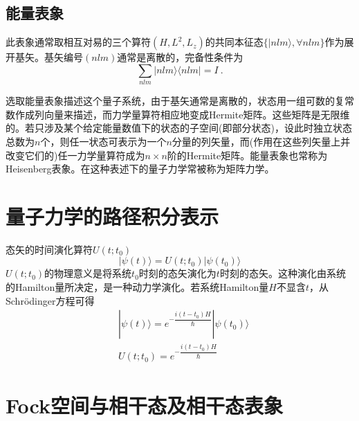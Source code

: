 \documentclass[11pt,a4paper]{article}
\begin{document}
\subsection{能量表象}
此表象通常取相互对易的三个算符$(H, L^2, L_z)$的共同本征态$\{|nlm \rangle, \forall nlm \}$作为展开基矢。基矢编号$(nlm)$通常是离散的，完备性条件为
\begin{equation}
\sum_{nlm} |nlm \rangle \langle nlm | = I ~.
\end{equation}



选取能量表象描述这个量子系统，由于基矢通常是离散的，状态用一组可数的复常数作成列向量来描述，而力学量算符相应地变成Hermite矩阵。这些矩阵是无限维的。若只涉及某个给定能量数值下的状态的子空间(即部分状态)，设此时独立状态总数为$n$个，则任一状态可表示为一个$n$分量的列矢量，而(作用在这些列矢量上并改变它们的)任一力学量算符成为$n\times n$阶的Hermite矩阵。能量表象也常称为Heisenberg表象。在这种表述下的量子力学常被称为矩阵力学。










\section{量子力学的路径积分表示}
态矢的时间演化算符$U(t; t_0)$
\begin{equation}
|\psi(t) \rangle = U(t; t_0) |\psi(t_0) \rangle
\end{equation}
$U(t; t_0)$的物理意义是将系统$t_0$时刻的态矢演化为$t$时刻的态矢。这种演化由系统的Hamilton量所决定，是一种动力学演化。若系统Hamilton量$H$不显含$t$，从Schr\"odinger方程可得
\begin{align}
& |\psi(t) \rangle = e^{-\dfrac{i(t-t_0)H}{\hbar}} |\psi(t_0) \rangle \\
& U(t; t_0) = e^{-\dfrac{i(t-t_0)H}{\hbar}}
\end{align}










\section{Fock空间与相干态及相干态表象}
\end{document}

